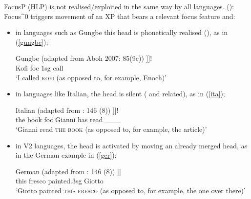 \documentclass[fleqn,10pt]{wlscirep}
\begin{document}
\noindent FocusP (HLP) is not realised/exploited in the same way by all languages. \citeauthor{samo2019cartography} (\citealt{samo2019cartography}): Focus^0 triggers movement of an XP that bears a relevant focus feature and:
\begin{itemize}
    \item \vspace*{-2mm} in languages such as Gungbe this head is phonetically realised (\citealt{aboh2004morphosyntax}), as in (\ref{gungbe});
    
        \begin{exe}
            \ex Gungbe (adapted from Aboh 2007: 85(9c))
                \gll [\textsubscript{FocusP}  	\textsc{kofi}\textsubscript{i}   [\textsubscript{Focus^0} 	wè 			[	ùn   		yró		\_\_\_\textsubscript{i}		]]]!\\
                {} Kofi        {} 			foc    {}    	1sg   	call {} {}\\
                \vspace{-3mm}
                \glt ‘I called \textsc{kofi} (as opposed to, for example, Enoch)’
        \label{gungbe}
        \end{exe}

    \item \vspace*{-2mm} in languages like Italian, the head is silent (\citealt{rizzi1997fine} and related), as in (\ref{ita});
        \begin{exe}
            \ex Italian (adapted from \citealt{samo2019cartography}: 146 (8))
                \gll [\textsubscript{FocusP} 	\textsc{il} \textsc{libro}\textsubscript{i}	    [\textsubscript{Focus^0} 	$\emptyset$ 		[	Gianni 		ha 		letto 	\_\_\_\textsubscript{i}	]]]!\\
                {} the book				{}		foc		{}	Gianni 		has 	read 	\_\_\_\\
                \vspace{-3mm}
                \glt ‘Gianni read \textsc{the} \textsc{book} (as opposed to, for example, the article)’	
                \label{ita}
        \end{exe}

    \item \vspace*{-2mm} in V2 languages, the head is activated by moving an already merged head, as in the German example in (\ref{ger}):
        \begin{exe}
            \ex	German (adapted from \citealt{samo2019cartography}: 146 (8))
                \gll [\textsubscript{SpecFoc} 	\textsc{dieses} 	\textsc{fresko} 	[\textsubscript{Focus^0} 	malte				[	Giotto ]]]\\
                {} this 			fresco			{}		painted.3sg	{}	Giotto \\
                \vspace*{-3mm}
                \glt ‘Giotto painted \textsc{this} \textsc{fresco} (as opposed to, for example, the one over there)’
                \label{ger}
        \end{exe}

\end{itemize}
\end{document}
